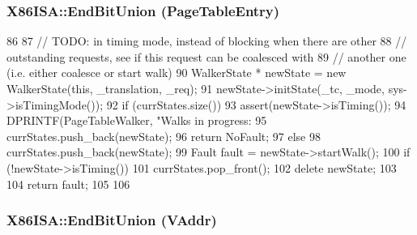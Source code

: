 \label{namespaceX86ISA_a269890a6e5fc8ed9f9d9da9aae67dbdd}
\hypertarget{namespaceX86ISA_a783dc6230f98af8cd46cce9be03e220c}{
\subsubsection[{EndBitUnion}]{\setlength{\rightskip}{0pt plus 5cm}X86ISA::EndBitUnion (PageTableEntry)}}
\label{namespaceX86ISA_a783dc6230f98af8cd46cce9be03e220c}



\begin{DoxyCode}
86 {
87     // TODO: in timing mode, instead of blocking when there are other
88     // outstanding requests, see if this request can be coalesced with
89     // another one (i.e. either coalesce or start walk)
90     WalkerState * newState = new WalkerState(this, _translation, _req);
91     newState->initState(_tc, _mode, sys->isTimingMode());
92     if (currStates.size()) {
93         assert(newState->isTiming());
94         DPRINTF(PageTableWalker, "Walks in progress: %
95         currStates.push_back(newState);
96         return NoFault;
97     } else {
98         currStates.push_back(newState);
99         Fault fault = newState->startWalk();
100         if (!newState->isTiming()) {
101             currStates.pop_front();
102             delete newState;
103         }
104         return fault;
105     }
106 }
\end{DoxyCode}
\hypertarget{namespaceX86ISA_a0e90d862d83a06c8942fdd136b580e74}{
\subsubsection[{EndBitUnion}]{\setlength{\rightskip}{0pt plus 5cm}X86ISA::EndBitUnion (VAddr)}}
\label{namespaceX86ISA_a0e90d862d83a06c8942fdd136b580e74}



